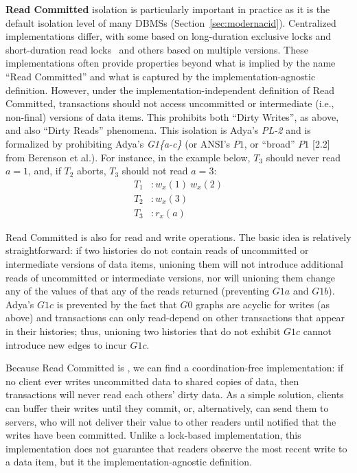 \textbf{Read Committed} isolation is particularly important in
practice as it is the default isolation level of many DBMSs
(Section~\ref{sec:modernacid}). Centralized implementations differ,
with some based on long-duration exclusive locks and short-duration
read locks~\cite{gray-isolation} and others based on multiple
versions. These implementations often provide properties beyond what
is implied by the name ``Read Committed'' and what is captured by the
implementation-agnostic definition. However, under the
implementation-independent definition of Read Committed, transactions
should not access uncommitted or intermediate (i.e., non-final)
versions of data items. This prohibits both ``Dirty Writes'', as
above, and also ``Dirty Reads'' phenomena.  This isolation is Adya's
\textit{PL-2} and is formalized by prohibiting Adya's
\textit{G1\{a-c\}} (or ANSI's $P1$, or ``broad'' $P1$ [2.2] from
Berenson et al.). For instance, in the example below, $T_3$ should
never read $a=1$, and, if $T_2$ aborts, $T_3$ should not read $a=3$:
\begin{align*}
T_1 &: w_x(1)~w_x(2)
\\T_2 &: w_x(3)\\
T_3 &: r_x(a)
\end{align*}

Read Committed is also \iconfluent for read and write operations. The
basic idea is relatively straightforward: if two histories do not
contain reads of uncommitted or intermediate versions of data items,
unioning them will not introduce additional reads of uncommitted or
intermediate versions, nor will unioning them change any of the values
of that any of the reads returned (preventing $G1a$ and $G1b$). Adya's
$G1c$ is prevented by the fact that $G0$ graphs are acyclic for writes
(as above) and transactions can only read-depend on other transactions
that appear in their histories; thus, unioning two histories that do
not exhibit $G1c$ cannot introduce new edges to incur $G1c$.

Because Read Committed is \iconfluent, we can find a coordination-free
implementation: if no client ever writes uncommitted data to shared
copies of data, then transactions will never read each others' dirty
data. As a simple solution, clients can buffer their writes until they
commit, or, alternatively, can send them to servers, who will not
deliver their value to other readers until notified that the writes
have been committed. Unlike a lock-based implementation, this
implementation does not guarantee that readers observe the most recent
write to a data item, but it the implementation-agnostic definition.

